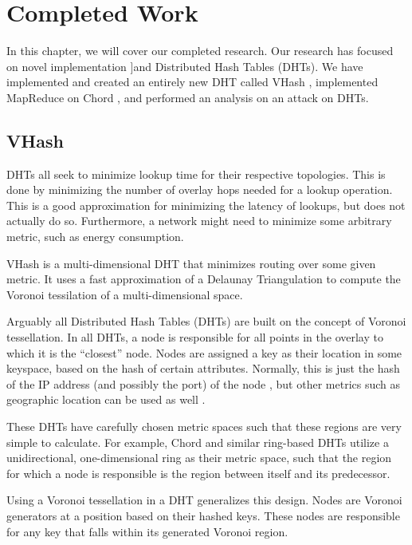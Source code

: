 \chapter{Completed Work}
\label{chapter:prev}

In this chapter, we will cover our completed research.
Our research has focused on novel implementation ]and Distributed Hash Tables (DHTs).
We have implemented and created an entirely new DHT called VHash \cite{vhash}, implemented MapReduce on Chord \cite{chordreduce}, and performed an analysis on an attack on DHTs.


\section{VHash}
DHTs all seek to minimize lookup time for their respective topologies.
This is done by minimizing the number of overlay hops needed for a lookup operation.
This is a good approximation for minimizing the latency of lookups, but does not actually do so.
Furthermore, a network might need to minimize some arbitrary metric, such as energy consumption.

VHash is a multi-dimensional DHT that minimizes routing over some given metric.
It uses a fast approximation of a Delaunay Triangulation to compute the Voronoi tessilation of a multi-dimensional space.



Arguably all Distributed Hash Tables (DHTs) are built on the concept of Voronoi tessellation.
In all DHTs, a node is responsible for all points in the overlay to which it is the ``closest'' node.
Nodes are assigned a key as their location in some keyspace, based on the hash of certain attributes.
Normally, this is just the hash of the IP address (and possibly the port) of the node \cite{chord} \cite{kademlia} \cite{can} \cite{pastry}, but other metrics such as geographic location can be used as well \cite{ratnasamy2002ght}.

These DHTs have carefully chosen metric spaces such that these regions are very simple to calculate.
For example, Chord \cite{chord} and similar ring-based DHTs \cite{symphony} utilize a unidirectional, one-dimensional ring as their metric space, such that the region for which a node is responsible is the region between itself and its predecessor.

Using a Voronoi tessellation in a DHT generalizes this design.
Nodes are Voronoi generators at a position based on their hashed keys.
These nodes are responsible for any key that falls within its generated Voronoi region.

